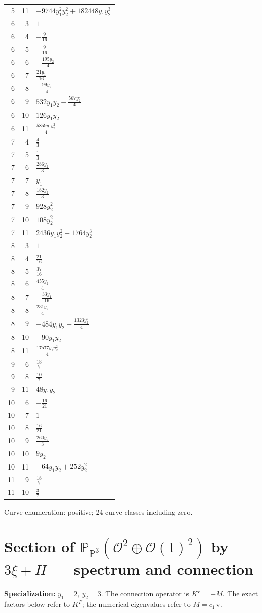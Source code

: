 \documentclass[10pt,a4paper]{article}
\begin{document}
{\begin{longtable}{rrp{125mm}}
5 & 11 & $- 9744 y_{1}^{2} y_{2}^{2} + 182448 y_{1} y_{2}^{3}$\\
6 & 3 & $1$\\
6 & 4 & $- \frac{9}{16}$\\
6 & 5 & $- \frac{9}{16}$\\
6 & 6 & $- \frac{195 y_{2}}{4}$\\
6 & 7 & $\frac{21 y_{1}}{16}$\\
6 & 8 & $- \frac{99 y_{2}}{4}$\\
6 & 9 & $532 y_{1} y_{2} - \frac{567 y_{2}^{2}}{4}$\\
6 & 10 & $126 y_{1} y_{2}$\\
6 & 11 & $\frac{5859 y_{1} y_{2}^{2}}{4}$\\
7 & 4 & $\frac{4}{3}$\\
7 & 5 & $\frac{1}{3}$\\
7 & 6 & $\frac{286 y_{2}}{3}$\\
7 & 7 & $y_{1}$\\
7 & 8 & $\frac{182 y_{2}}{3}$\\
7 & 9 & $928 y_{2}^{2}$\\
7 & 10 & $108 y_{2}^{2}$\\
7 & 11 & $2436 y_{1} y_{2}^{2} + 1764 y_{2}^{3}$\\
8 & 3 & $1$\\
8 & 4 & $\frac{21}{16}$\\
8 & 5 & $\frac{37}{16}$\\
8 & 6 & $\frac{455 y_{2}}{4}$\\
8 & 7 & $- \frac{33 y_{1}}{16}$\\
8 & 8 & $\frac{231 y_{2}}{4}$\\
8 & 9 & $- 484 y_{1} y_{2} + \frac{1323 y_{2}^{2}}{4}$\\
8 & 10 & $- 90 y_{1} y_{2}$\\
8 & 11 & $\frac{17577 y_{1} y_{2}^{2}}{4}$\\
9 & 6 & $\frac{18}{7}$\\
9 & 8 & $\frac{10}{7}$\\
9 & 11 & $48 y_{1} y_{2}$\\
10 & 6 & $- \frac{16}{21}$\\
10 & 7 & $1$\\
10 & 8 & $\frac{16}{21}$\\
10 & 9 & $\frac{260 y_{2}}{3}$\\
10 & 10 & $9 y_{2}$\\
10 & 11 & $- 64 y_{1} y_{2} + 252 y_{2}^{2}$\\
11 & 9 & $\frac{18}{7}$\\
11 & 10 & $\frac{3}{7}$\\
\end{longtable}}
Curve enumeration: positive; 24 curve classes including zero.
\clearpage\section*{Section of $\mathbb P_{\mathbb P^{3}}(\mathcal O^{2}\oplus \mathcal O(1)^{2})$ by $3\xi +H$ --- spectrum and connection}
\textbf{Specialization:} $y_1=2,\ y_2=3$. The connection operator is $K^F=-M$. The exact factors below refer to $K^F$; the numerical eigenvalues refer to $M=c_1\star$.
\end{document}

